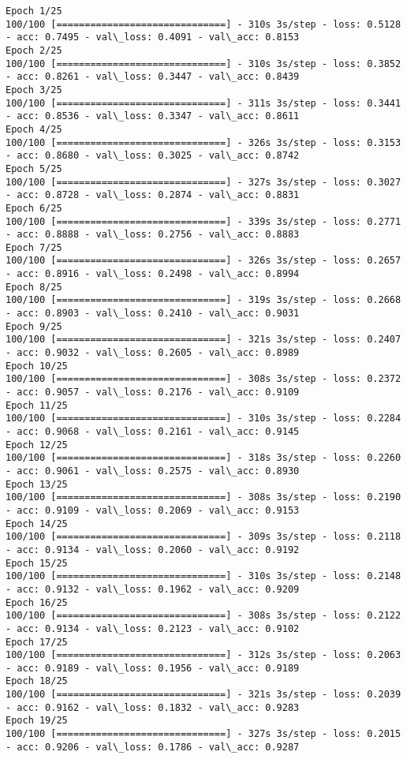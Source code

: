\documentclass[11pt]{article}
\begin{document}
    \begin{Verbatim}[commandchars=\\\{\}]
Epoch 1/25
100/100 [==============================] - 310s 3s/step - loss: 0.5128 - acc: 0.7495 - val\_loss: 0.4091 - val\_acc: 0.8153
Epoch 2/25
100/100 [==============================] - 310s 3s/step - loss: 0.3852 - acc: 0.8261 - val\_loss: 0.3447 - val\_acc: 0.8439
Epoch 3/25
100/100 [==============================] - 311s 3s/step - loss: 0.3441 - acc: 0.8536 - val\_loss: 0.3347 - val\_acc: 0.8611
Epoch 4/25
100/100 [==============================] - 326s 3s/step - loss: 0.3153 - acc: 0.8680 - val\_loss: 0.3025 - val\_acc: 0.8742
Epoch 5/25
100/100 [==============================] - 327s 3s/step - loss: 0.3027 - acc: 0.8728 - val\_loss: 0.2874 - val\_acc: 0.8831
Epoch 6/25
100/100 [==============================] - 339s 3s/step - loss: 0.2771 - acc: 0.8888 - val\_loss: 0.2756 - val\_acc: 0.8883
Epoch 7/25
100/100 [==============================] - 326s 3s/step - loss: 0.2657 - acc: 0.8916 - val\_loss: 0.2498 - val\_acc: 0.8994
Epoch 8/25
100/100 [==============================] - 319s 3s/step - loss: 0.2668 - acc: 0.8903 - val\_loss: 0.2410 - val\_acc: 0.9031
Epoch 9/25
100/100 [==============================] - 321s 3s/step - loss: 0.2407 - acc: 0.9032 - val\_loss: 0.2605 - val\_acc: 0.8989
Epoch 10/25
100/100 [==============================] - 308s 3s/step - loss: 0.2372 - acc: 0.9057 - val\_loss: 0.2176 - val\_acc: 0.9109
Epoch 11/25
100/100 [==============================] - 310s 3s/step - loss: 0.2284 - acc: 0.9068 - val\_loss: 0.2161 - val\_acc: 0.9145
Epoch 12/25
100/100 [==============================] - 318s 3s/step - loss: 0.2260 - acc: 0.9061 - val\_loss: 0.2575 - val\_acc: 0.8930
Epoch 13/25
100/100 [==============================] - 308s 3s/step - loss: 0.2190 - acc: 0.9109 - val\_loss: 0.2069 - val\_acc: 0.9153
Epoch 14/25
100/100 [==============================] - 309s 3s/step - loss: 0.2118 - acc: 0.9134 - val\_loss: 0.2060 - val\_acc: 0.9192
Epoch 15/25
100/100 [==============================] - 310s 3s/step - loss: 0.2148 - acc: 0.9132 - val\_loss: 0.1962 - val\_acc: 0.9209
Epoch 16/25
100/100 [==============================] - 308s 3s/step - loss: 0.2122 - acc: 0.9134 - val\_loss: 0.2123 - val\_acc: 0.9102
Epoch 17/25
100/100 [==============================] - 312s 3s/step - loss: 0.2063 - acc: 0.9189 - val\_loss: 0.1956 - val\_acc: 0.9189
Epoch 18/25
100/100 [==============================] - 321s 3s/step - loss: 0.2039 - acc: 0.9162 - val\_loss: 0.1832 - val\_acc: 0.9283
Epoch 19/25
100/100 [==============================] - 327s 3s/step - loss: 0.2015 - acc: 0.9206 - val\_loss: 0.1786 - val\_acc: 0.9287

\end{Verbatim}
\end{document}
